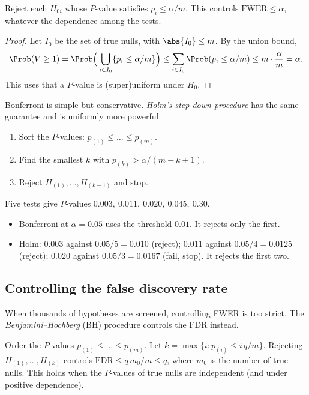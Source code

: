 \begin{theorem}\label{thm:bonf}
Reject each $H_{0i}$ whose $P$-value satisfies $p_i\le\alpha/m$. This controls $\mathrm{FWER}\le\alpha$, whatever the dependence among the tests.
\end{theorem}

\begin{proof}
Let $I_0$ be the set of true nulls, with $\abs{I_0}\le m$. By the union bound,
\[ \Prob(V\ge1)=\Prob\Big(\bigcup_{i\in I_0}\{p_i\le\alpha/m\}\Big)\le\sum_{i\in I_0}\Prob(p_i\le\alpha/m)\le m\cdot\frac\alpha m=\alpha. \]
This uses that a $P$-value is (super)uniform under $H_0$.
\end{proof}

Bonferroni is simple but conservative. \emph{Holm's step-down procedure} has the same guarantee and is uniformly more powerful:
\begin{enumerate}
  \item Sort the $P$-values: $p_{(1)}\le\dots\le p_{(m)}$.
  \item Find the smallest $k$ with $p_{(k)}>\alpha/(m-k+1)$.
  \item Reject $H_{(1)},\dots,H_{(k-1)}$ and stop.
\end{enumerate}

\begin{example}
Five tests give $P$-values $0.003,\ 0.011,\ 0.020,\ 0.045,\ 0.30$.
\begin{itemize}
  \item Bonferroni at $\alpha=0.05$ uses the threshold $0.01$. It rejects only the first.
  \item Holm: $0.003$ against $0.05/5=0.010$ (reject); $0.011$ against $0.05/4=0.0125$ (reject); $0.020$ against $0.05/3=0.0167$ (fail, stop). It rejects the first two.
\end{itemize}
\end{example}

\subsection{Controlling the false discovery rate}

When thousands of hypotheses are screened, controlling FWER is too strict. The \emph{Benjamini--Hochberg} (BH) procedure controls the FDR instead.

\begin{theorem}\label{thm:bh}
Order the $P$-values $p_{(1)}\le\dots\le p_{(m)}$. Let $k=\max\{i:p_{(i)}\le i\,q/m\}$. Rejecting $H_{(1)},\dots,H_{(k)}$ controls $\mathrm{FDR}\le q\,m_0/m\le q$, where $m_0$ is the number of true nulls. This holds when the $P$-values of true nulls are independent (and under positive dependence).
\end{theorem}

